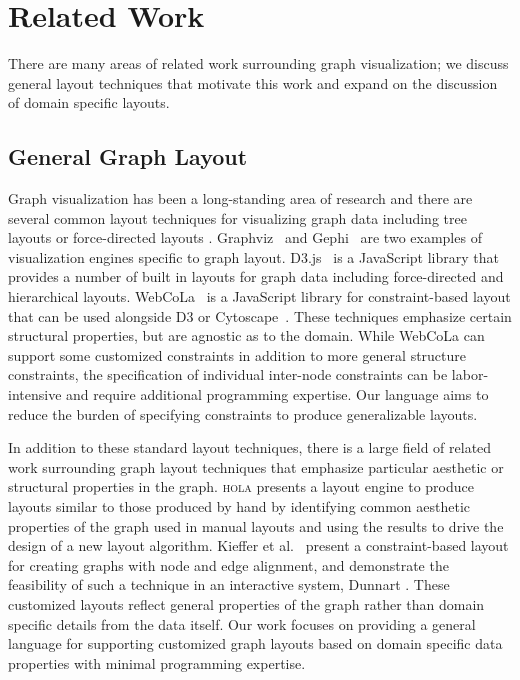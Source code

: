 \section{Related Work}
There are many areas of related work surrounding graph visualization; we
discuss general layout techniques that motivate this work and expand on the
discussion of domain specific layouts.

\subsection{General Graph Layout}
Graph visualization has been a long-standing area of research and there are
several common layout techniques for visualizing graph data including tree
layouts or force-directed layouts
\cite{herman2000graph,eades2010graph}. Graphviz~\cite{ellson2001graphviz}
and Gephi~\cite{bastian2009gephi} are two examples of visualization engines
specific to graph layout. D3.js~\cite{bostock:d3} is a JavaScript library
that provides a number of built in layouts for graph data including
force-directed and hierarchical layouts. WebCoLa~\cite{WebCoLa} is a
JavaScript library for constraint-based layout that can be used alongside
D3 or Cytoscape~\cite{shannon2003cytoscape}. These techniques emphasize
certain structural properties, but are agnostic as to the domain. While
WebCoLa can support some customized constraints in addition to more general
structure constraints, the specification of individual inter-node
constraints can be labor-intensive and require additional programming
expertise. Our language aims to reduce the burden of specifying constraints
to produce generalizable layouts.

In addition to these standard layout techniques, there is a large field of
related work surrounding graph layout techniques that emphasize particular
aesthetic or structural properties in the graph. \textsc{hola}
\cite{kieffer2016hola} presents a layout engine to produce layouts similar
to those produced by hand by identifying common aesthetic properties of the
graph used in manual layouts and using the results to drive the design of a
new layout algorithm. Kieffer et al.~\cite{kieffer2013incremental} present
a constraint-based layout for creating graphs with node and edge alignment,
and demonstrate the feasibility of such a technique in an interactive
system, Dunnart \cite{dwyer2008dunnart}. These customized layouts reflect
general properties of the graph rather than domain specific details from
the data itself. Our work focuses on providing a general language for
supporting customized graph layouts based on domain specific data
properties with minimal programming expertise.

